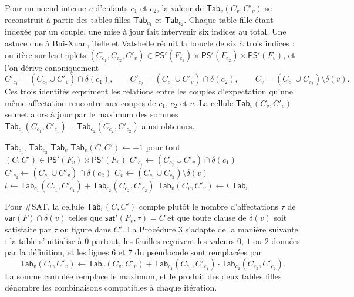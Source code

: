 \documentclass[11pt,a4paper]{report}
\theoremstyle{plain}
\theoremstyle{definition}
\begin{document}
Pour un noeud interne $v$ d'enfants $c_1$ et $c_2$, la valeur de
$\mathsf{Tab}_v(C_v, C'_v)$ se reconstruit à partir des tables filles
$\mathsf{Tab}_{c_1}$ et $\mathsf{Tab}_{c_2}$. Chaque table fille étant
indexée par un couple, une mise à jour fait intervenir six indices au
total. Une astuce due à Bui-Xuan, Telle et Vatshelle réduit la boucle
de six à trois indices : on itère sur les triplets
$(C_{c_1}, C_{c_2}, C'_v) \in \mathsf{PS}'(F_{c_1}) \times \mathsf{PS}'(F_{c_2}) \times \mathsf{PS}'(F_{\overline{v}})$,
et l'on dérive canoniquement
\[
  C'_{c_1} = (C_{c_2} \cup C'_v) \cap \delta(c_1),
  \qquad
  C'_{c_2} = (C_{c_1} \cup C'_v) \cap \delta(c_2),
  \qquad
  C_v = (C_{c_1} \cup C_{c_2}) \setminus \delta(v).
\]
Ces trois identités expriment les relations entre les couples
d'expectation qu'une même affectation rencontre aux coupes de $c_1$,
$c_2$ et $v$. La cellule $\mathsf{Tab}_v(C_v, C'_v)$ se met alors à jour
par le maximum des sommes
$\mathsf{Tab}_{c_1}(C_{c_1}, C'_{c_1}) + \mathsf{Tab}_{c_2}(C_{c_2}, C'_{c_2})$
ainsi obtenues.

\begin{algorithm}[H]
\caption{Calcul de $\mathsf{Tab}_v$ pour un noeud interne $v$ d'enfants $c_1, c_2$ (MaxSAT)}
\label{algo:proc3}
\begin{algorithmic}[1]
\Require $\mathsf{Tab}_{c_1}$, $\mathsf{Tab}_{c_2}$
\Ensure $\mathsf{Tab}_v$
\State $\mathsf{Tab}_v(C, C') \leftarrow -1$ pour tout $(C, C') \in \mathsf{PS}'(F_v) \times \mathsf{PS}'(F_{\overline{v}})$
  \State $C'_{c_1} \leftarrow (C_{c_2} \cup C'_v) \cap \delta(c_1)$
  \State $C'_{c_2} \leftarrow (C_{c_1} \cup C'_v) \cap \delta(c_2)$
  \State $C_v \leftarrow (C_{c_1} \cup C_{c_2}) \setminus \delta(v)$
  \State $t \leftarrow \mathsf{Tab}_{c_1}(C_{c_1}, C'_{c_1}) + \mathsf{Tab}_{c_2}(C_{c_2}, C'_{c_2})$
    \State $\mathsf{Tab}_v(C_v, C'_v) \leftarrow t$
  \EndIf
\EndFor
\State \Return $\mathsf{Tab}_v$
\end{algorithmic}
\end{algorithm}

Pour \#SAT, la cellule $\mathsf{Tab}_v(C, C')$ compte plutôt le nombre
d'affectations $\tau$ de $\mathsf{var}(F) \cap \delta(v)$ telles que
$\mathsf{sat}'(F_v, \tau) = C$ et que toute clause de $\delta(v)$ soit
satisfaite par $\tau$ ou figure dans $C'$. La Procédure 3 s'adapte de
la manière suivante : la table s'initialise à $0$ partout, les feuilles
reçoivent les valeurs $0$, $1$ ou $2$ données par la définition, et les
lignes 6 et 7 du pseudocode sont remplacées par
\[
  \mathsf{Tab}_v(C_v, C'_v) \leftarrow \mathsf{Tab}_v(C_v, C'_v)
  + \mathsf{Tab}_{c_1}(C_{c_1}, C'_{c_1}) \cdot \mathsf{Tab}_{c_2}(C_{c_2}, C'_{c_2}).
\]
La somme cumulée remplace le maximum, et le produit des deux tables
filles dénombre les combinaisons compatibles à chaque itération.
\end{document}
